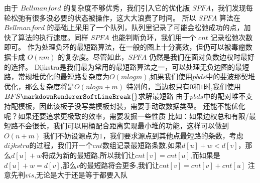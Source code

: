 {}\markdownRendererInterblockSeparator
{}
\markdownRendererSectionEnd \markdownRendererSectionBegin
{}\markdownRendererInterblockSeparator
{}由于 $Bellmanford$ 的复杂度不够优秀，我们引入它的优化版 $SPFA$，我们发现每轮松弛有很多没必要的状态被操作，这大大浪费了时间。\markdownRendererParagraphSeparator
{}所以 $SPFA$ 算法在 $Bellmanford$ 的基础上采用了一个队列，队列里记录了可能会松弛成功的点，加快了算法的执行速度。同样 $SPFA$ 也能判断负环，我们用一个 $cnt$ 记录松弛次数即可。\markdownRendererParagraphSeparator
{}作为处理负环的最短路算法，在一般的图上十分高效，但仍可以被毒瘤数据卡成 $O(nm)$ 的复杂度。尽管如此，$SPFA$ 仍然是我们在面对负数边权时最好的选择。\markdownRendererInterblockSeparator
{}\markdownRendererInterblockSeparator
{}
\markdownRendererSectionEnd \markdownRendererSectionBegin
{}\markdownRendererInterblockSeparator
{}Dijkstra是我们最为常用的最短路算法之一，可以处理无负边图的最短路，常规堆优化的最短路复杂度为$ O(mlogm) $,如果我们使用$ pbds $中的斐波那契堆优化，那么复杂度将是$ O(nlogn+m) $\markdownRendererParagraphSeparator
{}特别的，当边权只有$ 0 $和$ 1 $时,我们使用$ BFS\markdownRendererSoftLineBreak
{}$求解最短路\markdownRendererParagraphSeparator
{}由于$ pbds $中的配对堆不支持配模板，因此该板子没写类模板封装，需要手动改数据类型。\markdownRendererInterblockSeparator
{}\markdownRendererInterblockSeparator
{}还能不能优化呢？如果还要追求更极致的效率，需要发掘一些性质\markdownRendererParagraphSeparator
{}比如：如果边权总和有限/最短路不会很长，我们可以用桶配合距离实现最小堆的功能，这样可以做到$ O(n+m) $\markdownRendererInterblockSeparator
{}
\markdownRendererSectionEnd \markdownRendererSectionBegin
{}\markdownRendererInterblockSeparator
{}我们不妨设源点为$ 1 $，我们要求源点到其他点最短路的条数，考虑$ dijkstra $的过程，我们开一个$ cnt $数组记录最短路条数,如果$ d[u]+w<d[v] $，那么$ d[u]+w $将成为新的最短路,所以我们让$ cnt[v]=cnt[u] $,而如果是$ d[u]+w=d[v] $,那么$ v $的最短路将会更多,我们让$ cnt[v]=cnt[v]+cnt[u] $\markdownRendererParagraphSeparator
{}注意先判$ vis $,无论是大于还是等于都要入队\markdownRendererInterblockSeparator
{}
\markdownRendererSectionEnd \markdownRendererSectionBegin
{}\markdownRendererInterblockSeparator
